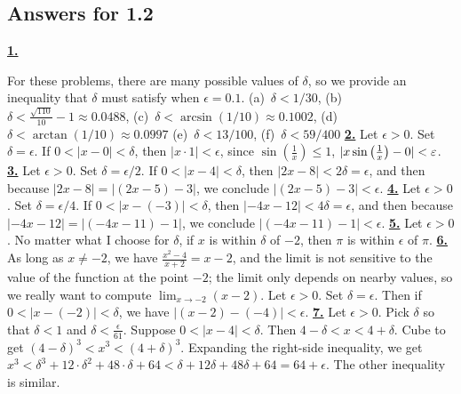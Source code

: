 \subsection *{Answers for 1.2}
\hypertarget {a:1.2.1}{\hyperlink {e:1.2.1}{\bfseries 1.}} \mdseries For these problems, there are many possible values of $\delta $, so we provide an inequality that $\delta $ must satisfy when $\epsilon = 0.1$.\hspace {1em} (a)~$\delta < 1/30$, (b)~$\delta < \frac {\sqrt {110}}{10} - 1 \approx 0.0488$, (c)~$\delta < \arcsin \left ( 1/10 \right ) \approx 0.1002$, (d)~$\delta < \arctan \left ( 1/10 \right ) \approx 0.0997$ (e)~$\delta < 13/100$, (f)~$\delta < 59/400$\qquad 
\hypertarget {a:1.2.2}{\hyperlink {e:1.2.2}{\bfseries 2.}} \mdseries Let $\epsilon >0$. Set $\delta = \epsilon $. If $0<|x-0| <\delta $, then $|x\cdot 1|<\epsilon $, since $\sin \left (\frac {1}{x}\right )\le 1$, $|x\sin \left ( {1\over x}\right )-0|< \epsilon $.\qquad 
\hypertarget {a:1.2.3}{\hyperlink {e:1.2.3}{\bfseries 3.}} \mdseries Let $\epsilon > 0$. Set $\delta = \epsilon /2$. If $0 < |x - 4| < \delta $, then $|2x - 8| < 2 \delta = \epsilon $, and then because $|2x - 8| = |(2x - 5) - 3|$, we conclude $|(2x - 5) - 3| < \epsilon $.\qquad 
\hypertarget {a:1.2.4}{\hyperlink {e:1.2.4}{\bfseries 4.}} \mdseries Let $\epsilon > 0$. Set $\delta = \epsilon /4$. If $0 < |x - (-3)| < \delta $, then $|-4x - 12| < 4 \delta = \epsilon $, and then because $|-4x - 12| = |(-4x - 11) - 1|$, we conclude $|(-4x - 11) - 1| < \epsilon $.\qquad 
\hypertarget {a:1.2.5}{\hyperlink {e:1.2.5}{\bfseries 5.}} \mdseries Let $\epsilon > 0$. No matter what I choose for $\delta $, if $x$ is within $\delta $ of $-2$, then $\pi $ is within $\epsilon $ of $\pi $.\qquad 
\hypertarget {a:1.2.6}{\hyperlink {e:1.2.6}{\bfseries 6.}} \mdseries As long as $x \neq -2$, we have $\frac {x^2-4}{x+2} = x-2$, and the limit is not sensitive to the value of the function at the point $-2$; the limit only depends on nearby values, so we really want to compute $\lim _{x \to -2} (x-2)$. Let $\epsilon > 0$. Set $\delta = \epsilon $. Then if $0 < |x - (-2)| < \delta $, we have $|(x - 2) - (-4)| < \epsilon $.\qquad 
\hypertarget {a:1.2.7}{\hyperlink {e:1.2.7}{\bfseries 7.}} \mdseries Let $\epsilon > 0$. Pick $\delta $ so that $\delta < 1$ and $\delta < \frac {\epsilon }{61}$. Suppose $0 < |x-4| < \delta $. Then $4 - \delta < x < 4 + \delta $. Cube to get $\left ( 4 - \delta \right )^3 < x^3 < \left ( 4 + \delta \right )^3$. Expanding the right-side inequality, we get $x^3 < \delta ^3 + 12\cdot \delta ^2 + 48\cdot \delta + 64 < \delta + 12 \delta + 48 \delta + 64 = 64 + \epsilon $. The other inequality is similar.\qquad 
